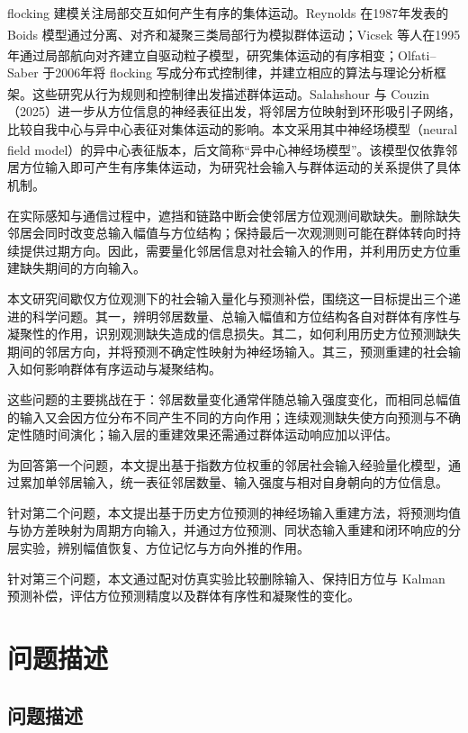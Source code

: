 \documentclass[UTF8,fontset=windows,11pt]{ctexart}
\newcommand{\upcite}[1]{\textsuperscript{\cite{#1}}}
\begin{document}
flocking 建模关注局部交互如何产生有序的集体运动。Reynolds 在1987年发表的 Boids 模型通过分离、对齐和凝聚三类局部行为模拟群体运动\upcite{Reynolds1987}；Vicsek 等人在1995年通过局部航向对齐建立自驱动粒子模型，研究集体运动的有序相变\upcite{Vicsek1995}；Olfati--Saber 于2006年将 flocking 写成分布式控制律，并建立相应的算法与理论分析框架\upcite{OlfatiSaber2006}。这些研究从行为规则和控制律出发描述群体运动。Salahshour 与 Couzin（2025）进一步从方位信息的神经表征出发，将邻居方位映射到环形吸引子网络，比较自我中心与异中心表征对集体运动的影响。本文采用其中神经场模型（neural field model）的异中心表征版本，后文简称“异中心神经场模型”\upcite{Salahshour2025}。该模型仅依靠邻居方位输入即可产生有序集体运动，为研究社会输入与群体运动的关系提供了具体机制。

在实际感知与通信过程中，遮挡和链路中断会使邻居方位观测间歇缺失。删除缺失邻居会同时改变总输入幅值与方位结构；保持最后一次观测则可能在群体转向时持续提供过期方向。因此，需要量化邻居信息对社会输入的作用，并利用历史方位重建缺失期间的方向输入。

本文研究间歇仅方位观测下的社会输入量化与预测补偿，围绕这一目标提出三个递进的科学问题。其一，辨明邻居数量、总输入幅值和方位结构各自对群体有序性与凝聚性的作用，识别观测缺失造成的信息损失。其二，如何利用历史方位预测缺失期间的邻居方向，并将预测不确定性映射为神经场输入。其三，预测重建的社会输入如何影响群体有序运动与凝聚结构。

这些问题的主要挑战在于：邻居数量变化通常伴随总输入强度变化，而相同总幅值的输入又会因方位分布不同产生不同的方向作用；连续观测缺失使方向预测与不确定性随时间演化；输入层的重建效果还需通过群体运动响应加以评估。

为回答第一个问题，本文提出基于指数方位权重的邻居社会输入经验量化模型，通过累加单邻居输入，统一表征邻居数量、输入强度与相对自身朝向的方位信息。

针对第二个问题，本文提出基于历史方位预测的神经场输入重建方法，将预测均值与协方差映射为周期方向输入，并通过方位预测、同状态输入重建和闭环响应的分层实验，辨别幅值恢复、方位记忆与方向外推的作用。

针对第三个问题，本文通过配对仿真实验比较删除输入、保持旧方位与 Kalman 预测补偿，评估方位预测精度以及群体有序性和凝聚性的变化。

\clearpage

\section{问题描述}

\subsection{问题描述}
\end{document}
